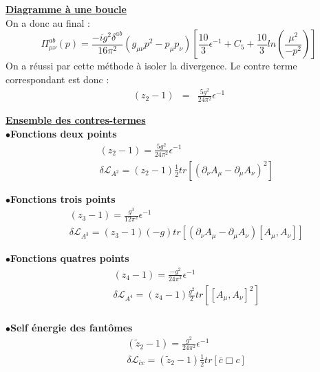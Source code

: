 \documentclass[a4paper,11pt]{article}
\theoremstyle{plain}
\theoremstyle{definition}
\theoremstyle{remark}
\numberwithin{equation}{section}
\numberwithin{equation}{subsection}
\numberwithin{figure}{section}
\begin{document}
\noindent
\noindent
\underline{\textbf{Diagramme à une boucle}} \\
On a donc au final :
\begin{equation}
\Pi^{ab}_{\mu \nu}(p) = \frac{-i g^2 \delta^{ab}}{16 \pi^{2}} 
\left( g_{\mu\nu}p^2 - p_{\mu}p_{\nu} \right) 
\left[ \frac{10}{3} \epsilon^{-1} + C_5 + \frac{10}{3} ln(\frac{\mu^2}{-p^2})  \right]
\end{equation}
On a réussi par cette méthode à isoler la divergence. Le contre terme correspondant est donc :
\begin{eqnarray}
 (z_{2} - 1) &=& \frac{5g^2}{24 \pi^2} \epsilon^{-1}
\end{eqnarray}

\vspace{2cm}
\noindent
\underline{\textbf{Ensemble des contres-termes}}\\

$\bullet$\hspace{1mm}\textbf{Fonctions deux points}
\begin{eqnarray}
&&  (z_{2} - 1) =\frac{5g^2}{24 \pi^2} \epsilon^{-1} \\
&& \delta \mathcal{L}_{A^{2}} = (z_{2} - 1) \frac{1}{2} tr [ ( \partial_{\nu} A_{\mu} - \partial_{\mu} A_{\nu} )^2 ]
\end{eqnarray}

$\bullet$\hspace{1mm}\textbf{Fonctions trois points}
\begin{eqnarray}
&&  (z_{3} - 1) =\frac{g^3}{12 \pi^2} \epsilon^{-1} \\
&& \delta \mathcal{L}_{A^{3}} = (z_{3} - 1) (-g) tr [ ( \partial_{\nu} A_{\mu} - \partial_{\mu} A_{\nu} ) [A_{\mu},A_{\nu}] ]
\end{eqnarray}

$\bullet$\hspace{1mm}\textbf{Fonctions quatres points}
\begin{eqnarray}
&&  (z_{4} - 1) =\frac{-g^2}{24 \pi^2} \epsilon^{-1} \\
&& \delta \mathcal{L}_{A^{4}} = (z_{4} - 1) \frac{g^2}{2} tr [ [A_{\mu},A_{\nu}]^2  ]
\end{eqnarray}\\

$\bullet$\hspace{1mm}\textbf{Self énergie des fantômes}
\begin{eqnarray}
&&  (\tilde{z}_{2} - 1) =\frac{g^2}{24 \pi^2} \epsilon^{-1} \\
&& \delta \mathcal{L}_{\overline{c}c} =  (\tilde{z}_{2} - 1) \frac{1}{2} tr [ \overline{c} \Box c ]
\end{eqnarray}\\
\end{document}

